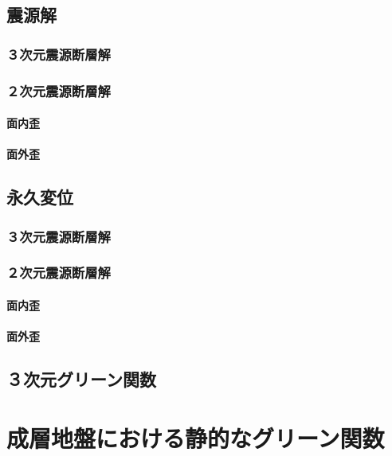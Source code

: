\subsection{震源解}

\subsubsection{３次元震源断層解}

\subsubsection{２次元震源断層解}

\paragraph{面内歪}

\paragraph{面外歪}

\subsection{永久変位}

\subsubsection{３次元震源断層解}

\subsubsection{２次元震源断層解}

\paragraph{面内歪}

\paragraph{面外歪}

\subsection{３次元グリーン関数}

\section{成層地盤における静的なグリーン関数}

